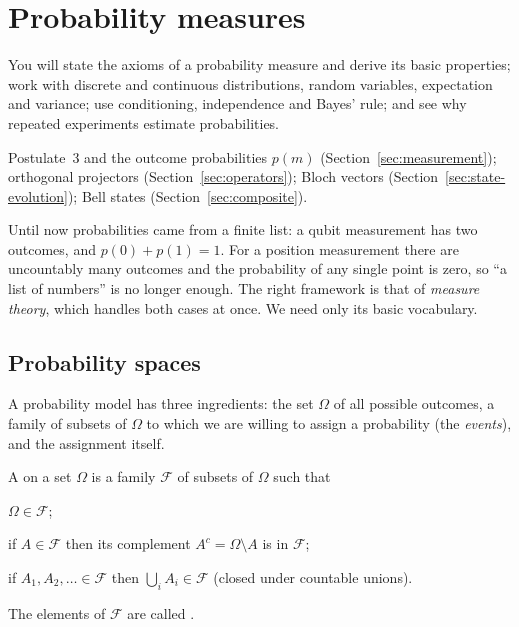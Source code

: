 \section{Probability measures}\label{sec:prob}

\begin{objectives}
  You will state the axioms of a probability measure and derive its basic properties; work with discrete and continuous distributions, random variables, expectation and variance;
  use conditioning, independence and Bayes' rule; and see why repeated experiments estimate probabilities.
\end{objectives}

\begin{recall}
  Postulate~3 and the outcome probabilities $p(m)$ (Section~\ref{sec:measurement}); orthogonal projectors (Section~\ref{sec:operators}); Bloch vectors (Section~\ref{sec:state-evolution}); Bell states (Section~\ref{sec:composite}).
\end{recall}

Until now probabilities came from a finite list: a qubit measurement has two outcomes, and $p(0)+p(1)=1$. For a position measurement there are uncountably many outcomes and the probability of any single point is zero, so
``a list of numbers'' is no longer enough. The right framework is that of \emph{measure theory}, which handles both cases at once. We need only its basic vocabulary.

\subsection{Probability spaces}

A probability model has three ingredients: the set $\Omega$ of all possible outcomes, a family of subsets of $\Omega$ to which we are willing to assign a probability (the \emph{events}), and the assignment itself.

\begin{definition}\label{def:sigma}
  A  on a set $\Omega$ is a family $\mathcal F$ of subsets of $\Omega$ such that
  \begin{steps}
    \item $\Omega\in\mathcal F$;
    \item if $A\in\mathcal F$ then its complement $A^c=\Omega\setminus A$ is in $\mathcal F$;
    \item if $A_1,A_2,\dots\in\mathcal F$ then $\bigcup_iA_i\in\mathcal F$ (closed under countable unions).
  \end{steps}
  The elements of $\mathcal F$ are called .
\end{definition}

